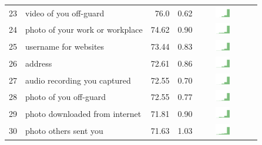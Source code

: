 \begin{table}[t]
\begin{center}
\begin{tabular}{| r | l | r | r | r | r |}
23 & video of you off-guard & 76.0 & 0.62 & \includegraphics[width = 2cm, height = 0.5cm]{tex-inputs/table-images/tookavideoofyouoff-guardcombined} \\ 
24 & photo of your work or workplace & 74.62 & 0.90 & \includegraphics[width = 2cm, height = 0.5cm]{tex-inputs/table-images/tookphotosatwork(withanoutward-facingcamera)combined} \\ 
25 & username for websites & 73.44 & 0.83 &  \includegraphics[width = 2cm, height = 0.5cm]{tex-inputs/table-images/learnedyourusernameforwebsitescombined} \\ 
26 & address & 72.61 & 0.86 & \includegraphics[width = 2cm, height = 0.5cm]{tex-inputs/table-images/learnedyouraddresscombined} \\ 
27 & audio recording you captured & 72.55  & 0.70 & \includegraphics[width = 2cm, height = 0.5cm]{tex-inputs/table-images/copiedanduploadedaudiorecordingsyoumadeonyourdevicecombined} \\ 
28 & photo of you off-guard & 72.55 & 0.77 & \includegraphics[width = 2cm, height = 0.5cm]{tex-inputs/table-images/tookaphotoofyouoff-guardcombined} \\ 
29 & photo downloaded from internet & 71.81 & 0.90 & \includegraphics[width = 2cm, height = 0.5cm]{tex-inputs/table-images/sharedphotosyoudownloadedfromtheinternetsavedonyourdevicecombined} \\ 
30 & photo others sent you & 71.63 & 1.03 & \includegraphics[width = 2cm, height = 0.5cm]{tex-inputs/table-images/sharedphotosotherssenttoyousavedonyourdevicecombined} \\ 

\end{tabular}
\end{center}
\end{table}
